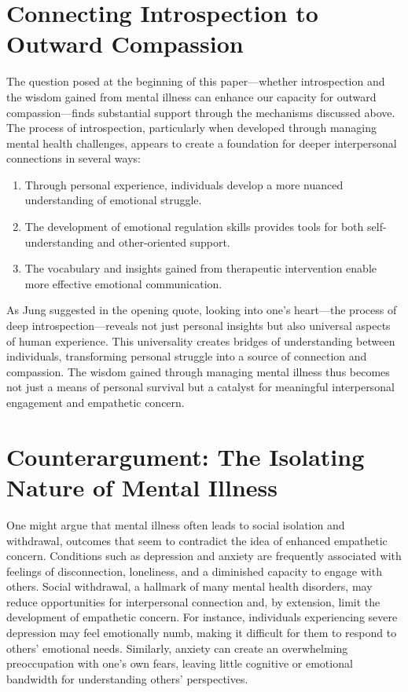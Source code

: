 \documentclass[stu]{apa7}
\begin{document}
\section{Connecting Introspection to Outward Compassion}

The question posed at the beginning of this paper—whether introspection and the wisdom gained from mental illness can enhance our capacity for outward compassion—finds substantial support through the mechanisms discussed above. The process of introspection, particularly when developed through managing mental health challenges, appears to create a foundation for deeper interpersonal connections in several ways:

\begin{enumerate}
    \item Through personal experience, individuals develop a more nuanced understanding of emotional struggle.
    \item The development of emotional regulation skills provides tools for both self-understanding and other-oriented support.
    \item The vocabulary and insights gained from therapeutic intervention enable more effective emotional communication.
\end{enumerate}

As Jung suggested in the opening quote, looking into one's heart—the process of deep introspection—reveals not just personal insights but also universal aspects of human experience. This universality creates bridges of understanding between individuals, transforming personal struggle into a source of connection and compassion. The wisdom gained through managing mental illness thus becomes not just a means of personal survival but a catalyst for meaningful interpersonal engagement and empathetic concern.

\section{Counterargument: The Isolating Nature of Mental Illness}

One might argue that mental illness often leads to social isolation and withdrawal, outcomes that seem to contradict the idea of enhanced empathetic concern. Conditions such as depression and anxiety are frequently associated with feelings of disconnection, loneliness, and a diminished capacity to engage with others. Social withdrawal, a hallmark of many mental health disorders, may reduce opportunities for interpersonal connection and, by extension, limit the development of empathetic concern. For instance, individuals experiencing severe depression may feel emotionally numb, making it difficult for them to respond to others' emotional needs. Similarly, anxiety can create an overwhelming preoccupation with one's own fears, leaving little cognitive or emotional bandwidth for understanding others' perspectives.
\end{document}
